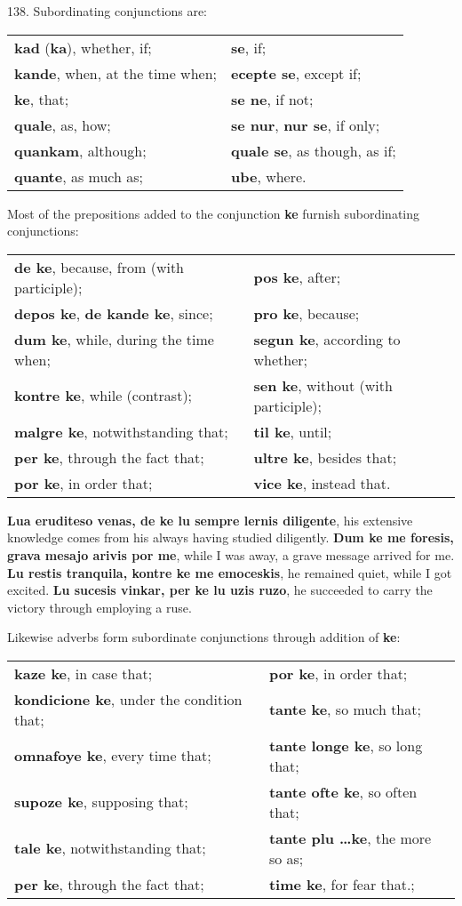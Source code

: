 138. Subordinating conjunctions are: \\
\begin{tabular}{l l}
\textbf{kad} (\textbf{ka}), whether, if; & \textbf{se}, if; \\
\textbf{kande}, when, at the time when; & \textbf{ecepte se}, except if; \\
\textbf{ke}, that; & \textbf{se ne}, if not; \\
\textbf{quale}, as, how; & \textbf{se nur}, \textbf{nur se}, if only; \\
\textbf{quankam}, although; & \textbf{quale se}, as though, as if; \\
\textbf{quante}, as much as; & \textbf{ube}, where.
\end{tabular}

Most of the prepositions added to the conjunction \textbf{ke} furnish subordinating conjunctions: \\
\begin{tabular}{l l}
\textbf{de ke}, because, from (with participle); & \textbf{pos ke}, after; \\
\textbf{depos ke}, \textbf{de kande ke}, since; & \textbf{pro ke}, because; \\
\textbf{dum ke}, while, during the time when; & \textbf{segun ke}, according to whether; \\
\textbf{kontre ke}, while (contrast); & \textbf{sen ke}, without (with participle); \\
\textbf{malgre ke}, notwithstanding that; & \textbf{til ke}, until; \\
\textbf{per ke}, through the fact that; & \textbf{ultre ke}, besides that; \\
\textbf{por ke}, in order that; & \textbf{vice ke}, instead that.
\end{tabular}

\textbf{Lua eruditeso venas, de ke lu sempre lernis diligente}, his extensive knowledge comes from his always having studied diligently. \textbf{Dum ke me foresis, grava mesajo arivis por me}, while I was away, a grave message arrived for me. \textbf{Lu restis tranquila, kontre ke me emoceskis}, he remained quiet, while I got excited. \textbf{Lu sucesis vinkar, per ke lu uzis ruzo}, he succeeded to carry the victory through employing a ruse.

Likewise adverbs form subordinate conjunctions through addition of \textbf{ke}: \\
\begin{tabular}{l l}
\textbf{kaze ke}, in case that; & \textbf{por ke}, in order that; \\
\textbf{kondicione ke}, under the condition that; & \textbf{tante ke}, so much that; \\
\textbf{omnafoye ke}, every time that; & \textbf{tante longe ke}, so long that; \\
\textbf{supoze ke}, supposing that; & \textbf{tante ofte ke}, so often that; \\
\textbf{tale ke}, notwithstanding that; & \textbf{tante plu \ldots ke}, the more so as; \\
\textbf{per ke}, through the fact that; & \textbf{time ke}, for fear that.;
\end{tabular}

